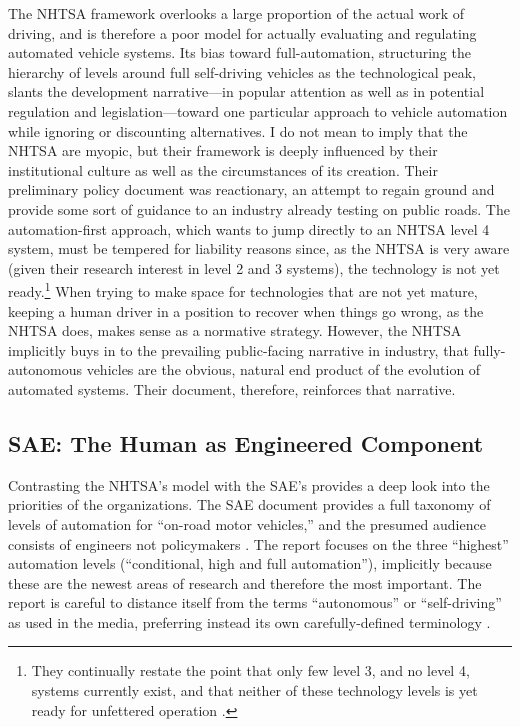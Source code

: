 The NHTSA framework overlooks a large proportion of the actual work of
driving, and is therefore a poor model for actually evaluating and
regulating automated vehicle systems. Its bias toward
full-automation, structuring the hierarchy of levels around full
self-driving vehicles as the technological peak, slants the
development narrative---in popular attention as well as in
potential regulation and legislation---toward one particular approach
to vehicle automation while ignoring or discounting alternatives. I do
not mean to imply that the NHTSA are myopic, but their framework is
deeply influenced by their institutional culture as well as the
circumstances of its creation. Their preliminary policy document was
reactionary, an attempt to regain ground and provide some sort of guidance to an
industry already testing on public roads. The automation-first
approach, which wants to jump directly to an NHTSA level 4 system,
must be tempered for liability reasons since, as the 
NHTSA is very aware (given their research interest in level 2 and 3
systems), the technology is not yet ready.\footnote{They continually
  restate the point that only few level 3, and no level 4, systems
  currently exist, and that neither of these technology levels is yet
  ready for unfettered operation \cite[p. 10, 14]{NHTSA}.} When trying to make space for
technologies that are not yet mature, keeping a human driver in a
position to recover when things go wrong, as the NHTSA does, makes sense as a normative
strategy. However, the NHTSA implicitly buys in to the prevailing
public-facing narrative in industry, that fully-autonomous vehicles
are the obvious, natural end product of the evolution of automated
systems. Their document, therefore, reinforces that narrative.

\subsection{SAE: The Human as Engineered Component}

Contrasting the NHTSA's model with the SAE's provides a deep look into
the priorities of the organizations. The SAE document provides a full
taxonomy of levels of automation for ``on-road motor vehicles,'' and the
presumed audience consists of engineers not policymakers \cite{SAE}. The report
focuses on the three ``highest'' automation levels (``conditional, high
and full automation''), implicitly because these are the newest areas
of research and therefore the most important. The report is careful to
distance itself from the terms ``autonomous'' or ``self-driving'' as used
in the media, preferring instead its own carefully-defined
terminology \cite[p. 5-6]{SAE}. 

